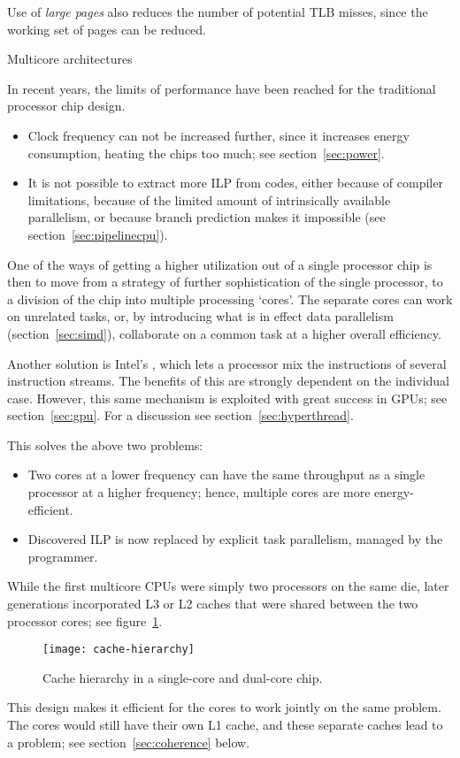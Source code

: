 Use of \emph{large pages} also reduces the
number of potential TLB misses, since the working set of pages can be
reduced.

 {Multicore architectures}
\label{sec:multicore}

In recent years, the limits of performance have been reached for the
traditional processor chip design.
\begin{itemize}
\item Clock frequency can not be increased further, since it increases
  energy consumption, heating the chips too
  much; see section~\ref{sec:power}. 
\item It is not possible to extract more \acf{ILP}
  from codes, either because of compiler limitations, because of the
  limited amount of intrinsically available parallelism, or because
  branch prediction makes it impossible (see
  section~\ref{sec:pipelinecpu}).
\end{itemize}

One of the ways of getting a higher utilization out of a single
processor chip is then to move from a strategy of further
sophistication of the single processor, to a division of the chip into
multiple processing `cores'.
The separate cores can work on unrelated
tasks, or, by introducing what is in effect data parallelism
(section~\ref{sec:simd}), collaborate on a common task at a higher
overall efficiency\cite{Olukotun:1996:single-chip}.
\begin{remark}
Another solution is Intel's
  , which lets a processor mix the instructions of
  several instruction streams. The benefits of this are strongly
  dependent on the individual case. However, this same mechanism is
  exploited with great success in GPUs; see
  section~\ref{sec:gpu}. For a discussion see
  section~\ref{sec:hyperthread}.
\end{remark}

This solves the above two problems:
\begin{itemize}
\item Two cores at a lower frequency can have the same throughput as a
  single processor at a higher frequency; hence, multiple cores are
  more energy-efficient.
\item Discovered \ac{ILP} is now replaced by explicit task
  parallelism, managed by the programmer.
\end{itemize}

While the first multicore \acp{CPU}
were simply two processors on the same die, later generations
incorporated L3 or L2 caches that were shared between the two
processor cores; see figure~\ref{fig:core-caches}.
\begin{figure}[ht]
  \texttt{[image: cache-hierarchy]}
  \caption{Cache hierarchy in a single-core and dual-core chip.}
  \label{fig:core-caches}
\end{figure}
This design makes it efficient for the cores to work
jointly on the same problem. 
The cores would still have their own L1 cache, and these separate
caches lead to a  problem; see
section~\ref{sec:coherence} below.

